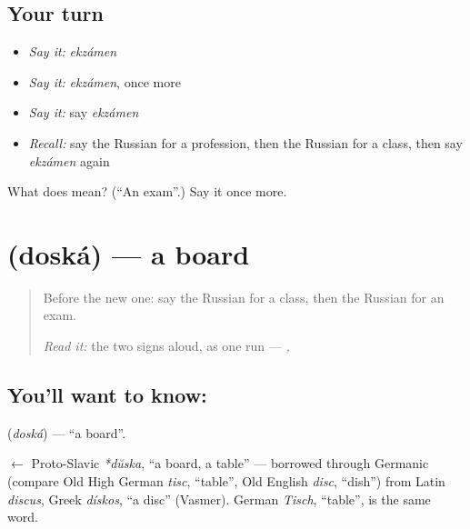 \subsection*{Your turn}
\begin{itemize}
\raggedright
  \item \emph{Say it:} \emph{ekzámen}
  \item \emph{Say it:} \emph{ekzámen}, once more
  \item \emph{Say it:} say \emph{ekzámen}
  \item \emph{Recall:} say the Russian for a profession, then the Russian for a class, then say \emph{ekzámen} again
\end{itemize}

\begin{tcolorbox}[breakable,colback=teal!4,colframe=teal!35!black,title={Before you move on}]
What does  mean? (\textquotedblleft{}An exam\textquotedblright{}.) Say it once more.
\end{tcolorbox}
\section[\texorpdfstring{\ru{доска} (doská)}{доска (doská)}]{ (doská) — a board}

\label{lesson:RU-C111-board}



\begin{quote}
Before the new one: say the Russian for a class, then the Russian for an exam.

\emph{Read it:} the two signs aloud, as one run — \emph{ ,  }
\end{quote}

\subsection*{You'll want to know: }
\textbf{} (\emph{doská}) — \textquotedblleft{}a board\textquotedblright{}.

\begin{cousinweb}
\textbf{} $\leftarrow$ Proto-Slavic \emph{*dŭska}, \textquotedblleft{}a board, a table\textquotedblright{} — borrowed through Germanic (compare Old High German \emph{tisc}, \textquotedblleft{}table\textquotedblright{}, Old English \emph{disc}, \textquotedblleft{}dish\textquotedblright{}) from Latin \emph{discus}, Greek \emph{dískos}, \textquotedblleft{}a disc\textquotedblright{} (Vasmer). German \emph{Tisch}, \textquotedblleft{}table\textquotedblright{}, is the same word.
\end{cousinweb}

